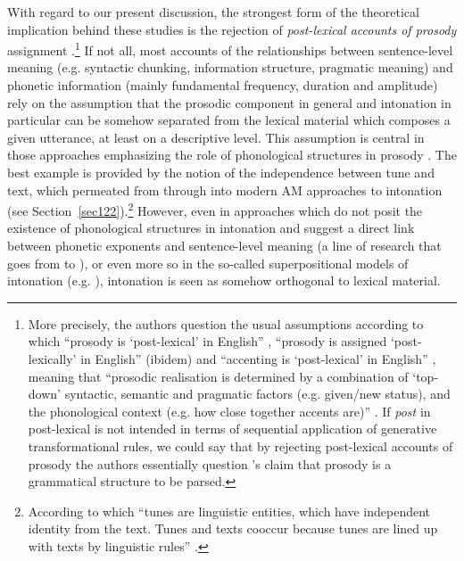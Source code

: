 With regard to our present discussion, the strongest form of the theoretical implication behind these studies is the rejection of \textit{post-lexical accounts of prosody} assignment \citep{schweitzer2010relative,schweitzer2011prosodic}.\footnote{More precisely, the authors question the usual assumptions according to which ``prosody is `post-lexical' in English'' \citep[1]{schweitzer2011prosodic}, ``prosody is assigned `post-lexically' in English'' (ibidem) and ``accenting is `post-lexical' in English'' \citep[1]{schweitzer2010relative}, meaning that ``prosodic realisation is determined
by a combination of `top-down' syntactic, semantic and pragmatic factors (e.g. given/new status), and the phonological context (e.g. how close together accents are)'' \citep[4]{schweitzer2011prosodic}. If \textit{post} in post-lexical is not intended in terms of sequential application of generative transformational rules, we could say that by rejecting post-lexical accounts of prosody the authors essentially question \citeauthor{beckman1996parsing}'s \citeyearpar{beckman1996parsing} claim that prosody is a grammatical structure to be parsed.}  If not all, most accounts of the relationships between sentence-level meaning (e.g. syntactic chunking, information structure, pragmatic meaning) and phonetic information (mainly fundamental frequency, duration and amplitude) rely on the assumption that the prosodic component in general and intonation in particular can be somehow separated from the lexical material which composes a given utterance, at least on a descriptive level. This assumption is central in those approaches emphasizing the role of phonological structures in prosody \citep{ladd2008intonational}. The best example is provided by the notion of the independence between tune and text, which permeated from \citet{liberman1979intonational} through \citet{pierrehumbert1980phonology} into modern AM approaches to intonation (see Section~\ref{sec122}).\footnote{According to which ``tunes are linguistic entities, which have independent identity from the text. Tunes and texts cooccur because tunes are lined up with texts by linguistic rules'' \citep[19]{pierrehumbert1980phonology}.} However, even in approaches which do not posit the existence of phonological structures in intonation and suggest a direct link between phonetic exponents and sentence-level meaning (a line of research that goes from \citealt{cooper1980syntax} to \citealt{xu2005speech}), or even more so in the so-called superpositional models of intonation (e.g. \citealt{fujisaki1982modelling}), intonation is seen as somehow orthogonal to lexical material. 

